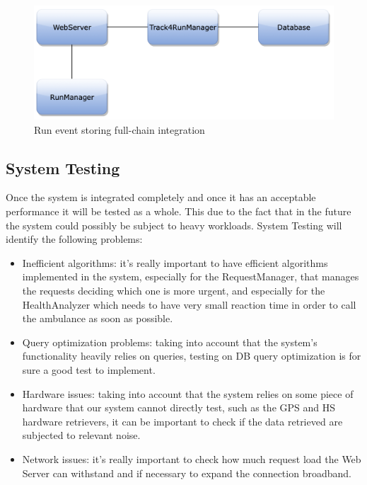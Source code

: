 \begin{figure}[H]
\centering
\includegraphics[scale=0.35]{Images/IntegrationPlanImages/fig18.png}
\caption{Run event storing full-chain integration}
\end{figure}


\subsection{System Testing}
Once the system is integrated completely and once it has an acceptable performance it will be tested as a whole. This due to the fact that in the future the system could possibly be subject to heavy workloads. System Testing will identify the following problems:

\begin{itemize}
\item Inefficient algorithms: it's really important to have efficient algorithms implemented in the system, especially for the RequestManager, that manages the requests deciding which one is more urgent, and especially for the HealthAnalyzer which needs to have very small reaction time in order to call the ambulance as soon as possible.
\item Query optimization problems: taking into account that the system's functionality heavily relies on queries, testing on DB query optimization is for sure a good test to implement.
\item Hardware issues: taking into account that the system relies on some piece of hardware that our system cannot directly test, such as the GPS and HS hardware retrievers, it can be important to check if the data retrieved are subjected to relevant noise.
\item Network issues: it's really important to check how much request load the Web Server can withstand and if necessary to expand the connection broadband.
\end{itemize}

